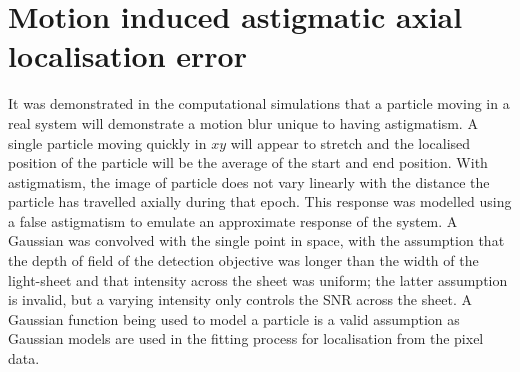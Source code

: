 \section{Motion induced astigmatic axial localisation error}\label{sec:spt_maths}

It was demonstrated in the computational simulations that a particle moving in a real system will demonstrate a motion blur unique to having astigmatism.
A single particle moving quickly in $xy$ will appear to stretch and the localised position of the particle will be the average of the start and end position.
With astigmatism, the image of particle does not vary linearly with the distance the particle has travelled axially during that epoch.
This response was modelled %
using
a false astigmatism %
to emulate an approximate response of the system.
A Gaussian was convolved with the single point in space, with the assumption that the depth of field of the detection objective was longer than the width of the light-sheet and that intensity across the sheet was uniform;
the latter assumption is invalid, but a varying intensity only controls the SNR across the sheet.
A Gaussian function being used to model a particle is a valid assumption as Gaussian models are used in the fitting process for localisation from the pixel data.

